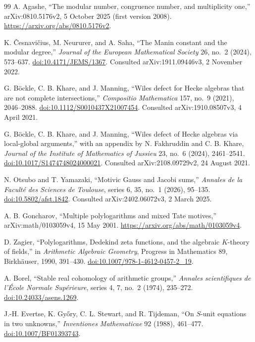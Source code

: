 \begin{thebibliography}{99}
A. Agashe,
``The modular number, congruence number, and multiplicity one,''
arXiv:0810.5176v2, 5 October 2025 (first version 2008).
\url{https://arxiv.org/abs/0810.5176v2}.

K. \v{C}esnavi\v{c}ius, M. Neururer, and A. Saha,
``The Manin constant and the modular degree,''
\emph{Journal of the European Mathematical Society} 26, no.~2 (2024), 573--637.
\href{https://doi.org/10.4171/JEMS/1367}{doi:10.4171/JEMS/1367}.
Consulted arXiv:1911.09446v3, 2 November 2022.

G. B\"ockle, C. B. Khare, and J. Manning,
``Wiles defect for Hecke algebras that are not complete intersections,''
\emph{Compositio Mathematica} 157, no.~9 (2021), 2046--2088.
\href{https://doi.org/10.1112/S0010437X21007454}{doi:10.1112/S0010437X21007454}.
Consulted arXiv:1910.08507v3, 4 April 2021.

G. B\"ockle, C. B. Khare, and J. Manning,
``Wiles defect of Hecke algebras via local-global arguments,''
with an appendix by N. Fakhruddin and C. B. Khare,
\emph{Journal of the Institute of Mathematics of Jussieu} 23, no.~6 (2024), 2461--2541.
\href{https://doi.org/10.1017/S1474748024000021}{doi:10.1017/S1474748024000021}.
Consulted arXiv:2108.09729v2, 24 August 2021.

N. Otsubo and T. Yamazaki,
``Motivic Gauss and Jacobi sums,''
\emph{Annales de la Facult\'e des Sciences de Toulouse}, series 6,
35, no.~1 (2026), 95--135.
\href{https://doi.org/10.5802/afst.1842}{doi:10.5802/afst.1842}.
Consulted arXiv:2402.06072v3, 2 March 2025.

A. B. Goncharov,
``Multiple polylogarithms and mixed Tate motives,''
arXiv:math/0103059v4, 15 May 2001.
\url{https://arxiv.org/abs/math/0103059v4}.

D. Zagier,
``Polylogarithms, Dedekind zeta functions, and the algebraic $K$-theory of fields,''
in \emph{Arithmetic Algebraic Geometry}, Progress in Mathematics 89,
Birkh\"auser, 1990, 391--430.
\href{https://doi.org/10.1007/978-1-4612-0457-2_19}{doi:10.1007/978-1-4612-0457-2\_19}.

A. Borel,
``Stable real cohomology of arithmetic groups,''
\emph{Annales scientifiques de l'\'Ecole Normale Sup\'erieure}, series 4,
7, no.~2 (1974), 235--272.
\href{https://doi.org/10.24033/asens.1269}{doi:10.24033/asens.1269}.

J.-H. Evertse, K. Gy\H{o}ry, C. L. Stewart, and R. Tijdeman,
``On $S$-unit equations in two unknowns,''
\emph{Inventiones Mathematicae} 92 (1988), 461--477.
\href{https://doi.org/10.1007/BF01393743}{doi:10.1007/BF01393743}.


\end{thebibliography}
